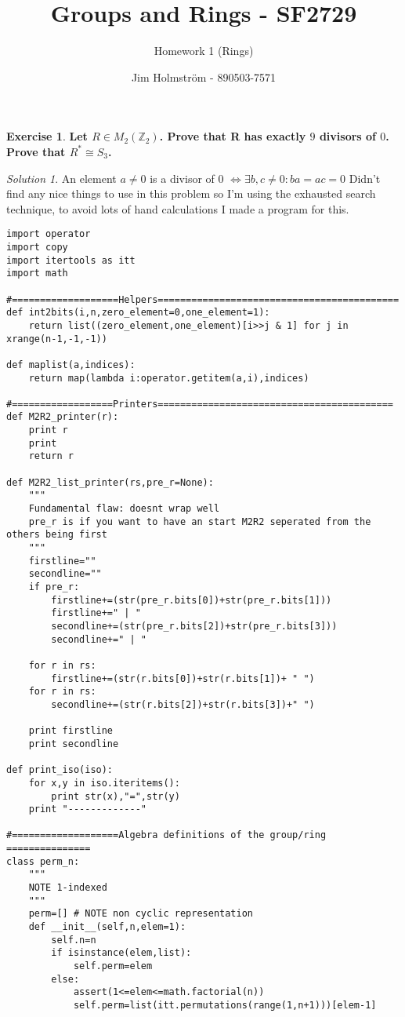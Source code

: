 \documentclass[a4paper,twoside=false,abstract=false,numbers=noenddot,
titlepage=false,headings=small,parskip=half,version=last]{scrartcl}
\author{Jim Holmström - 890503-7571}
\title{Groups and Rings - SF2729}
\subtitle{Homework 1 (Rings)}
\theoremstyle{definition}
\newtheorem{exercise}{Exercise}
\theoremstyle{remark}
\newtheorem*{solution}{Solution}
\newcommand{\ZZ}{\ensuremath{\mathbb{Z}}}
\begin{document}
\maketitle
\thispagestyle{empty}

\begin{exercise}
{\bf
Let $R \in M_2(\ZZ_2)$. Prove that R has exactly $9$ divisors of $0$. Prove
that $R^* \cong S_3$.
}
\end{exercise}
\begin{solution}
An element $a \neq 0$ is a divisor of 0 $\Leftrightarrow \exists b,c \neq 0 : ba=ac=0$
Didn't find any nice things to use in this problem so I'm using the exhausted
search technique, to avoid lots of hand calculations I made a program for this.\\

\begin{verbatim}
import operator
import copy
import itertools as itt
import math

#===================Helpers===========================================
def int2bits(i,n,zero_element=0,one_element=1):
    return list((zero_element,one_element)[i>>j & 1] for j in xrange(n-1,-1,-1))

def maplist(a,indices):
    return map(lambda i:operator.getitem(a,i),indices)

#==================Printers==========================================
def M2R2_printer(r):
    print r
    print 
    return r

def M2R2_list_printer(rs,pre_r=None):
    """
    Fundamental flaw: doesnt wrap well
    pre_r is if you want to have an start M2R2 seperated from the others being first
    """
    firstline=""
    secondline=""
    if pre_r:
        firstline+=(str(pre_r.bits[0])+str(pre_r.bits[1]))
        firstline+=" | "
        secondline+=(str(pre_r.bits[2])+str(pre_r.bits[3]))
        secondline+=" | "

    for r in rs:
        firstline+=(str(r.bits[0])+str(r.bits[1])+ " ")
    for r in rs:
        secondline+=(str(r.bits[2])+str(r.bits[3])+" ")

    print firstline
    print secondline

def print_iso(iso):
    for x,y in iso.iteritems():
        print str(x),"=",str(y)
    print "-------------"

#===================Algebra definitions of the group/ring ===============
class perm_n:
    """
    NOTE 1-indexed
    """
    perm=[] # NOTE non cyclic representation
    def __init__(self,n,elem=1):
        self.n=n
        if isinstance(elem,list):
            self.perm=elem
        else:
            assert(1<=elem<=math.factorial(n))
            self.perm=list(itt.permutations(range(1,n+1)))[elem-1]


\end{verbatim}
\end{solution}
\end{document}
